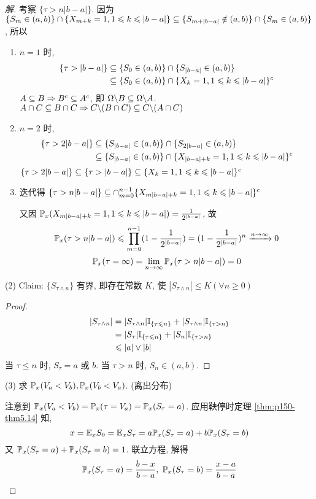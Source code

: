\begin{proof}[解]
考察 $\{\tau>n|b-a|\}$. 因为 $\{S_m\in (a,b)\}\cap \{X_{m+k}=1,1\leqslant k\leqslant |b-a|\}\subseteq \{S_{m+|b-a|}\notin (a,b)\}\cap \{S_m\in (a,b)\}$, 所以
\begin{enumerate}
    \item $n=1$ 时,
    \[
    \begin{aligned}
        \{\tau>|b-a|\} &\subseteq \{S_0\in (a,b)\} \cap\{S_{|b-a|}\in (a,b)\} \\
        &\subseteq \{S_0\in (a,b)\} \cap \{X_k=1,1\leqslant k\leqslant |b-a|\}^c
    \end{aligned}
    \]
    $A\subseteq B\Rightarrow B^c\subseteq A^c$, 即 $\Omega\backslash B\subseteq \Omega\backslash A$. $A\cap C\subseteq B\cap C\Rightarrow C\backslash (B\cap C)\subseteq C\backslash (A\cap C)$
    \item $n=2$ 时,
    \[
    \begin{aligned}
        \{\tau>2|b-a|\} &\subseteq \{S_{|b-a|}\in (a,b)\}\cap \{S_{2|b-a|}\in (a,b)\}\\
        &\subseteq \{S_{|b-a|}\in (a,b)\} \cap \{X_{|b-a|+k}=1,1\leqslant k\leqslant |b-a|\}^c
    \end{aligned}
    \]
    $\{\tau>2|b-a|\}\subseteq \{\tau>|b-a|\}\subseteq\{X_k=1,1\leqslant k\leqslant |b-a|\}^c$
    \item 迭代得 $\{\tau>n|b-a|\}\subseteq\cap_{m=0}^{n-1}\{X_{m|b-a|+k}=1,1\leqslant k\leqslant |b-a|\}^c$
    
    又因 $\mathbb{P}_x(X_{m|b-a|+k}=1,1\leqslant k\leqslant |b-a|)=\frac{1}{2^{|b-a|}}$, 故
    \[
    \mathbb{P}_x(\tau> n|b-a|)\leqslant\prod_{m=0}^{n-1}(1-\frac{1}{2^{|b-a|}})=(1-\frac{1}{2^{|b-a|}})^n\xrightarrow{n\to\infty}0
    \]
    \[
    \mathbb{P}_x(\tau=\infty)=\lim_{n \to \infty}\mathbb{P}_x(\tau>n|b-a|)=0
    \]
\end{enumerate}

(2) Claim: $\{S_{\tau\land n}\}$ 有界, 即存在常数 $K$, 使 $|S_{\tau\land n}|\leq K (\forall n\geq 0)$
\begin{proof}
    \[
    \begin{aligned}
        |S_{\tau\land n}| &= |S_{\tau\land n}|\mathbb I_{\{\tau\leqslant n\}}+|S_{\tau\land n}|\mathbb I_{\{\tau> n\}}\\
        &=|S_{\tau}|\mathbb I_{\{\tau\leqslant n\}}+|S_n|\mathbb I_{\{\tau> n\}}\\
        &\leqslant |a|\lor |b|
    \end{aligned}
    \]
当 $\tau\leq n$ 时, $S_{\tau}=a$ 或 $b$. 当 $\tau>n$ 时, $S_n\in (a,b)$.
\end{proof}

(3) 求 $\mathbb{P}_x(V_a<V_b), \mathbb{P}_x(V_b<V_a)$. (离出分布)

注意到 $\mathbb{P}_x(V_a<V_b)=\mathbb{P}_x(\tau=V_a)=\mathbb{P}_x(S_{\tau}=a)$. 应用鞅停时定理 \ref{thm:p150-thm5.14} 知, 
\[
x=\mathbb E_x S_0=\mathbb E_x S_{\tau}=a\mathbb{P}_x(S_{\tau}=a)+b\mathbb{P}_x(S_{\tau}=b)
\]
又 $\mathbb{P}_x(S_{\tau}=a)+\mathbb{P}_x(S_{\tau}=b)=1$. 联立方程, 解得
\[
\PP_x(S_{\tau}=a)=\frac{b-x}{b-a}, \ \PP_x(S_{\tau}=b)=\frac{x-a}{b-a}
\]
\end{proof}

